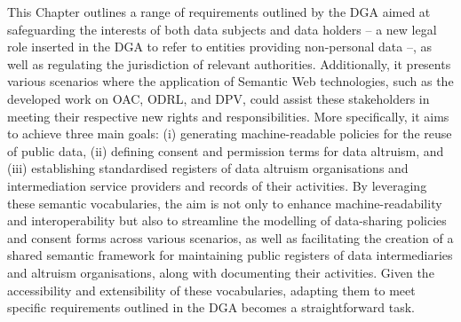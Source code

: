 This Chapter outlines a range of requirements outlined by the DGA aimed at safeguarding the interests of both data subjects and data holders -- a new legal role inserted in the DGA to refer to entities providing non-personal data --, as well as regulating the jurisdiction of relevant authorities. 
Additionally, it presents various scenarios where the application of Semantic Web technologies, such as the developed work on OAC, ODRL, and DPV, could assist these stakeholders in meeting their respective new rights and responsibilities.
More specifically, it aims to achieve three main goals: (i) generating machine-readable policies for the reuse of public data, (ii) defining consent and permission terms for data altruism, and (iii) establishing standardised registers of data altruism organisations and intermediation service providers and records of their activities.
By leveraging these semantic vocabularies, the aim is not only to enhance machine-readability and interoperability but also to streamline the modelling of data-sharing policies and consent forms across various scenarios, as well as facilitating the creation of a shared semantic framework for maintaining public registers of data intermediaries and altruism organisations, along with documenting their activities.
Given the accessibility and extensibility of these vocabularies, adapting them to meet specific requirements outlined in the DGA becomes a straightforward task.

% 
% 
% 
% 



